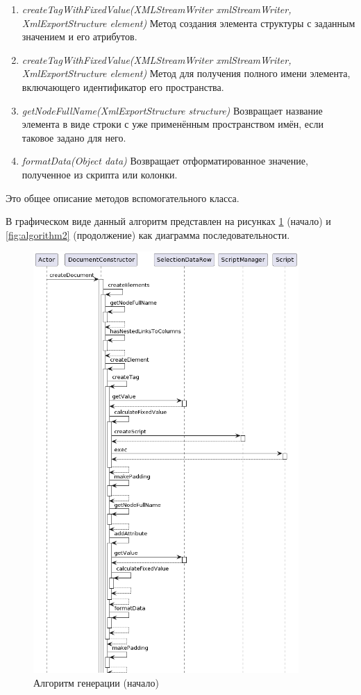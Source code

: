\documentclass[a4paper,12pt]{diplom}
\begin{document}
\begin{enumerate}[label=\arabic{enumi})]
{    SelectionDataRow dataRow, int nestedLevel)} Метод создания элемента структуры (тега).
    \item \textit{createTagWithFixedValue(XMLStreamWriter xmlStreamWriter, XmlExportStructure element)} Метод создания элемента структуры с заданным значением и его атрибутов.
    \item \textit{createTagWithFixedValue(XMLStreamWriter xmlStreamWriter, XmlExportStructure element)} Метод для получения полного имени элемента, включающего идентификатор его пространства.
    \item \textit{getNodeFullName(XmlExportStructure structure)} Возвращает название элемента в виде строки с уже применённым пространством имён, если таковое задано для него.
    \item \textit{formatData(Object data)} Возвращает отформатированное значение, полученное из скрипта или колонки.
\end{enumerate}

Это общее описание методов вспомогательного класса.

В графическом виде данный алгоритм представлен на рисунках \ref{fig:algorithm1} (начало) и \ref{fig:algorithm2} (продолжение) как диаграмма последовательности. 

\begin{figure}[h!]
	\centering
	\includegraphics[width=0.9\textwidth]{imgs/crDoc1.png}
	\caption{Алгоритм генерации (начало)}
	\label{fig:algorithm1}
\end{figure}
\end{document}
